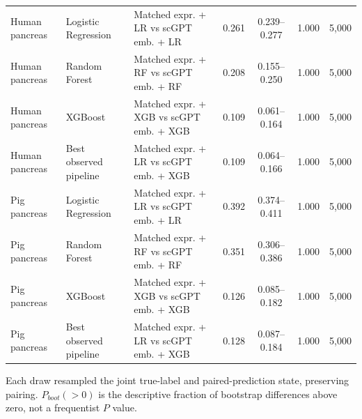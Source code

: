 \begin{landscape}
\begin{longtable}{lllcccc}
Human pancreas & Logistic Regression & Matched expr. + LR vs scGPT emb. + LR & 0.261 & 0.239--0.277 & 1.000 & 5,000 \\
Human pancreas & Random Forest & Matched expr. + RF vs scGPT emb. + RF & 0.208 & 0.155--0.250 & 1.000 & 5,000 \\
Human pancreas & XGBoost & Matched expr. + XGB vs scGPT emb. + XGB & 0.109 & 0.061--0.164 & 1.000 & 5,000 \\
Human pancreas & Best observed pipeline & Matched expr. + LR vs scGPT emb. + XGB & 0.109 & 0.064--0.166 & 1.000 & 5,000 \\
Pig pancreas & Logistic Regression & Matched expr. + LR vs scGPT emb. + LR & 0.392 & 0.374--0.411 & 1.000 & 5,000 \\
Pig pancreas & Random Forest & Matched expr. + RF vs scGPT emb. + RF & 0.351 & 0.306--0.386 & 1.000 & 5,000 \\
Pig pancreas & XGBoost & Matched expr. + XGB vs scGPT emb. + XGB & 0.126 & 0.085--0.182 & 1.000 & 5,000 \\
Pig pancreas & Best observed pipeline & Matched expr. + LR vs scGPT emb. + XGB & 0.128 & 0.087--0.184 & 1.000 & 5,000 \\
\end{longtable}
\noindent\footnotesize Each draw resampled the joint true-label and paired-prediction state, preserving pairing. $P_{boot}(>0)$ is the descriptive fraction of bootstrap differences above zero, not a frequentist $P$ value.
\end{landscape}

